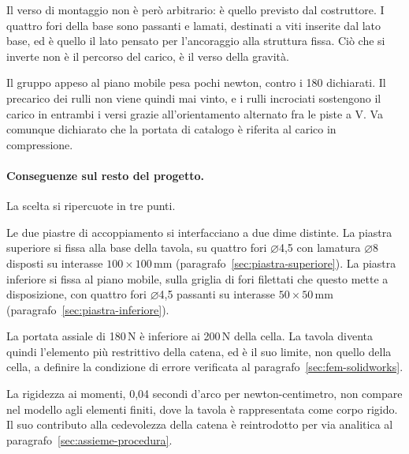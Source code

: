 Il verso di montaggio non è però arbitrario: è quello previsto dal costruttore.
I quattro fori della base sono passanti e lamati, destinati a viti inserite dal
lato base, ed è quello il lato pensato per l'ancoraggio alla struttura fissa.
Ciò che si inverte non è il percorso del carico, è il verso della gravità.

Il gruppo appeso al piano mobile pesa pochi newton, contro i 180 dichiarati.
Il precarico dei rulli non viene quindi mai vinto, e i rulli incrociati
sostengono il carico in entrambi i versi grazie all'orientamento alternato fra
le piste a V. Va comunque dichiarato che la portata di catalogo è riferita al
carico in compressione.

\paragraph{Conseguenze sul resto del progetto.}
La scelta si ripercuote in tre punti.

Le due piastre di accoppiamento si interfacciano a due dime distinte. La piastra
superiore si fissa alla base della tavola, su quattro fori $\varnothing$4,5 con
lamatura $\varnothing$8 disposti su interasse $100 \times 100$\,mm
(paragrafo~\ref{sec:piastra-superiore}). La piastra inferiore si fissa al piano
mobile, sulla griglia di fori filettati che questo mette a disposizione, con
quattro fori $\varnothing$4,5 passanti su interasse $50 \times 50$\,mm
(paragrafo~\ref{sec:piastra-inferiore}).

La portata assiale di 180\,N è inferiore ai 200\,N della cella. La tavola
diventa quindi l'elemento più restrittivo della catena, ed è il suo limite, non
quello della cella, a definire la condizione di errore verificata al
paragrafo~\ref{sec:fem-solidworks}.

La rigidezza ai momenti, 0,04 secondi d'arco per newton-centimetro, non compare
nel modello agli elementi finiti, dove la tavola è rappresentata come corpo
rigido. Il suo contributo alla cedevolezza della catena è reintrodotto per via
analitica al paragrafo~\ref{sec:assieme-procedura}.

